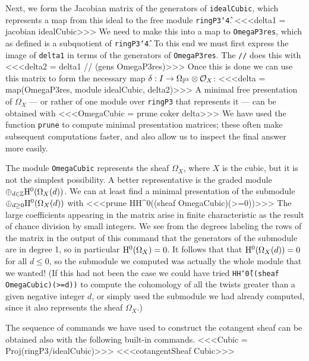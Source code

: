 Next, we form the Jacobian matrix of the generators
of
{\tt idealCubic}, which represents a map
from this ideal to the free module {\tt ringP3\char`\^4}.
<<<delta1 = jacobian idealCubic>>>
We need to make this into a map to {\tt OmegaP3res}, which
as defined is a subquotient of {\tt ringP3\char`\^4}. To this end
we must first express the image of {\tt delta1} in terms of
the generators of {\tt OmegaP3res}. The  {\tt //}
does this with
<<<delta2 = delta1 // (gens OmegaP3res)>>>
Once this is done we can use this matrix to form the
necessary map $\delta: I\to \Omega_{{\mathbb P}^3}\otimes{\cal O}_X$:
<<<delta = map(OmegaP3res, module idealCubic, delta2)>>>
A minimal free presentation of $\Omega_X$ --- or rather of
one module over
{\tt ringP3} that represents it --- can be obtained with
<<<OmegaCubic = prune coker delta>>>
We have used the function {\tt prune} to compute
minimal presentation matrices; these often make subsequent
computations faster, and also allow us to inspect the final 
answer more easily. 

The module {\tt OmegaCubic} represents the sheaf $\Omega_{X}$, where
$X$ is the cubic, but it is not the simplest possibility.
A better representative is the graded module
$\oplus_{d\in {\mathbb Z}} {\rm H}^0(\Omega_X(d))$. We can at least find 
a minimal presentation of the
submodule $\oplus_{d\geq 0} {\rm H}^0(\Omega_X(d))$ with
<<<prune HH^0((sheaf OmegaCubic)(>=0))>>>
The large coefficients appearing in the matrix arise in finite characteristic as the result
of chance division by small integers.
We see from the degrees labeling the rows of the matrix in the
output of this command that
the generators of the submodule are in degree 1,
so in particular ${\rm H}^0(\Omega_X) = 0$.
It follows that that
${\rm H}^0(\Omega_X(d)) = 0$ for all $d\leq 0$, so
the submodule we computed was actually the whole module
that we wanted! (If this had not been the case we could have tried
{\tt HH\char`\^0((sheaf OmegaCubic)(>=d))} to compute the cohomology
of all the twists greater than a given negative integer $d$,
or simply used the submodule we had already computed, since
it also represents the sheaf $\Omega_X$.)


The sequence of commands we have used to construct the
cotangent sheaf can be obtained also with
the following built-in commands.
<<<Cubic = Proj(ringP3/idealCubic)>>>
<<<cotangentSheaf Cubic>>>


